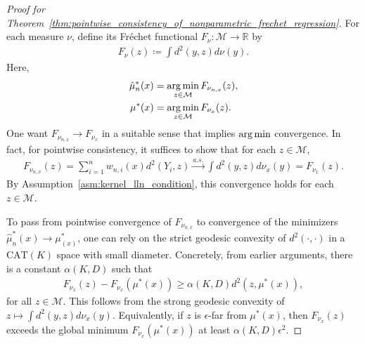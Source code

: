 \begin{proof}[Proof for Theorem~\ref{thm:pointwise_consistency_of_nonparametric_frechet_regression}]
    For each measure $\nu$, define its Fréchet functional $F_\nu \colon \mathcal{M} \to \mathbb{R}$ by
    \begin{align*}
        F_\nu(z) \coloneqq \int d^2(y, z) d\nu(y).
    \end{align*}
    Here,
    \begin{align*}
        \hat{\mu}^*_n(x) &= \operatorname*{arg\,min}_{z \in \mathcal{M}} F_{\nu_{n,x}}(z), \\
        \mu^*(x) &= \operatorname*{arg\,min}_{z \in \mathcal{M}} F_{\nu_x}(z).
    \end{align*}
    One want $F_{\nu_{n,x}} \to F_{\nu_x}$ in a suitable sense that implies $\operatorname*{arg\,min}$ convergence.
    In fact, for pointwise consistency, it suffices to show that for each $z \in \mathcal{M}$,
    \begin{align*}
        F_{\nu_{n,x}}(z) = \sum^n_{i=1}w_{n,i}(x) d^2(Y_i, z) \overset{a.s.}{\to} \int d^2(y, z)d\nu_{x}(y) = F_{\nu_x}(z).
    \end{align*}
    By Assumption~\ref{asm:kernel_lln_condition}, this convergence holds for each $z \in \mathcal{M}$.

    To pass from pointwise convergence of $F_{\nu_{n,x}}$ to convergence of the minimizers $\hat{\mu}^*_n(x) \to \mu^*_(x)$, one can rely on the strict geodesic convexity of $d^2(\cdot, \cdot)$ in a $\mathrm{CAT}(K)$ space with small diameter.
    Concretely, from earlier arguments, there is a constant $\alpha(K, D)$ such that
    \begin{align*}
        F_{\nu_x}(z) - F_{\nu_x}(\mu^*(x)) \geq \alpha(K, D) d^2(z, \mu^*(x)),
    \end{align*}
    for all $z \in \mathcal{M}$.
    This follows from the strong geodesic convexity of $z \mapsto \int d^2(y, z)d\nu_x(y)$.
    Equivalently, if $z$ is $\epsilon$-far from $\mu^*(x)$, then $F_{\nu_x}(z)$ exceeds the global minimum $F_{\nu_x}(\mu^*(x))$ at least $\alpha(K, D)\epsilon^2$.


\end{proof}
